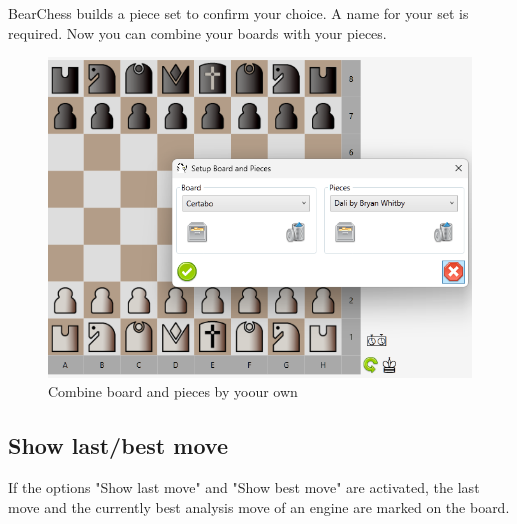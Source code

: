 \documentclass[11pt,a4paper]{article}
\begin{document}
BearChess builds a piece set to confirm your choice. A name for your set is required.
Now you can combine your boards with your pieces.

\begin{figure}[H]
	\centering
	\includegraphics[scale=0.7]{CombineBoardPieces.png}
	\caption{Combine board and pieces by yoour own }
	\label{fig:CombineBoardPieces}
\end{figure}

\subsection{Show last/best move}
If the options "Show last move" and "Show best move" are activated, the last move and the currently best analysis move of an engine are marked on the board.
\end{document}

